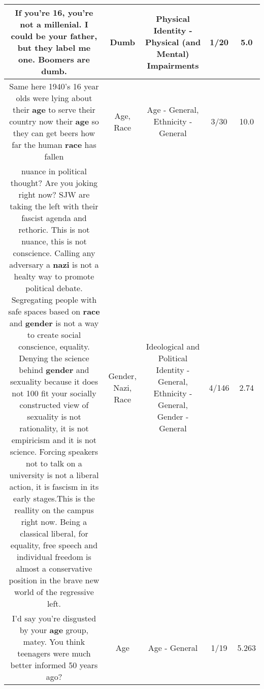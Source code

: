 \documentclass[11pt]{article}
\newlength\mylength
\begin{document}
\begin{center}
\begin{longtable}{|C{.65\mylength}|C{.30\mylength}|C{.12\mylength}|C{.12\mylength}|C{.12\mylength}|}
  \small If you're 16, you're not a millenial. I could be your father,  but they label me one. Boomers are \textbf{dumb}.\normalsize   & Dumb & Physical Identity - Physical (and Mental) Impairments & 1/20 & 5.0 \\  \hline
  \small Same here 1940's 16 year olds were lying about their \textbf{age} to serve their country now their \textbf{age} so they can get beers how far the human \textbf{race} has fallen\normalsize   & Age, Race & Age - General, Ethnicity - General & 3/30 & 10.0 \\  \hline
  \small nuance in political thought? Are you joking right now? SJW are taking the left with their fascist agenda and rethoric. This is not nuance, this is not conscience. Calling any adversary a \textbf{nazi} is not a healty way to promote political debate. Segregating people with safe spaces based on \textbf{race} and \textbf{gender} is not a way to create social conscience, equality. Denying the science behind \textbf{gender} and sexuality because it does not 100 fit your socially constructed view of sexuality is not rationality, it is not empiricism and it is not science. Forcing speakers not to talk on a university is not a liberal action, it is fascism in its early stages.This is the reallity on the campus right now. Being a classical liberal, for equality, free speech and individual freedom is almost a conservative position in the brave new world of the regressive left.\normalsize   & Gender, Nazi, Race &  Ideological and Political Identity - General, Ethnicity - General, Gender - General & 4/146 & 2.74 \\  \hline
  \small I'd say you're disgusted by your \textbf{age} group, matey. You think teenagers were much better informed 50 years ago?\normalsize   & Age & Age - General & 1/19 & 5.263 \\  \hline

\end{longtable}
\end{center}
\end{document}
